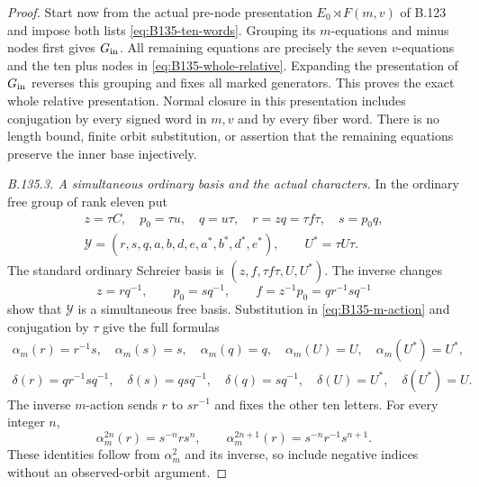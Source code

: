 \begin{proof}
Start now from the actual pre-node presentation
$E_0\rtimes F(m,v)$ of B.123 and impose both lists
\eqref{eq:B135-ten-words}. Grouping its $m$-equations and
minus nodes first gives $G_{\rm in}$. All remaining equations
are precisely the seven $v$-equations and the ten plus nodes
in \eqref{eq:B135-whole-relative}. Expanding the presentation
of $G_{\rm in}$ reverses this grouping and fixes all marked
generators. This proves the exact whole relative presentation.
Normal closure in this presentation includes conjugation by
every signed word in $m,v$ and by every fiber word. There is
no length bound, finite orbit substitution, or assertion that
the remaining equations preserve the inner base injectively.

\emph{B.135.3. A simultaneous ordinary basis and the actual characters.}
In the ordinary free group of rank eleven put
\begin{equation}\label{eq:B135-new-basis}
 \begin{gathered}
 z=\tau C,\quad p_0=\tau u,\quad q=u\tau,\quad
 r=zq=\tau f\tau,\quad s=p_0q,\\
 \mathcal Y=(r,s,q,a,b,d,e,a^*,b^*,d^*,e^*),\qquad U^*=\tau U\tau.
 \end{gathered}
\end{equation}
The standard ordinary Schreier basis is
$(z,f,\tau f\tau,U,U^*)$. The inverse changes
\[
 z=rq^{-1},\qquad p_0=sq^{-1},\qquad
 f=z^{-1}p_0=q r^{-1}s q^{-1}
\]
show that \(\mathcal Y\) is a simultaneous free basis.
Substitution in \eqref{eq:B135-m-action} and conjugation by
$\tau$ give the full formulas
\begin{equation}\label{eq:B135-basis-actions}
 \begin{gathered}
 \alpha_m(r)=r^{-1}s,\quad
 \alpha_m(s)=s,\quad\alpha_m(q)=q,\quad
 \alpha_m(U)=U,\quad\alpha_m(U^*)=U^*,\\
 \delta(r)=q r^{-1}s q^{-1},\quad
 \delta(s)=q s q^{-1},\quad\delta(q)=s q^{-1},\quad
 \delta(U)=U^*,\quad\delta(U^*)=U.
 \end{gathered}
\end{equation}
The inverse $m$-action sends $r$ to $sr^{-1}$ and fixes
the other ten letters. For every integer $n$,
\[
 \alpha_m^{2n}(r)=s^{-n}rs^n,\qquad
 \alpha_m^{2n+1}(r)=s^{-n}r^{-1}s^{n+1}.
\]
These identities follow from $\alpha_m^2$ and its inverse,
so include negative indices without an observed-orbit argument.


\end{proof}
